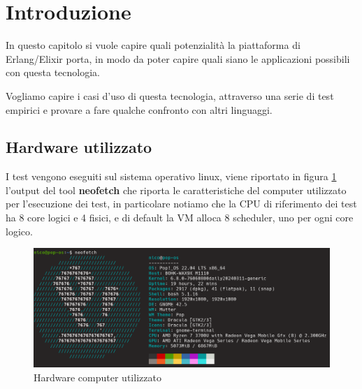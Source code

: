 \section{Introduzione}
In questo capitolo si vuole capire quali potenzialità
la piattaforma di Erlang/Elixir porta, in modo da poter
capire quali siano le applicazioni possibili con questa tecnologia.

Vogliamo capire i casi d'uso di questa tecnologia, attraverso una serie
di test empirici e provare a fare qualche confronto con altri
linguaggi.

\subsection{Hardware utilizzato}

I test vengono eseguiti sul sistema operativo linux, viene riportato in
figura \ref{fig:neofetch} l'output del tool \textbf{neofetch} che riporta
le caratteristiche del computer utilizzato per l'esecuzione dei test,
in particolare notiamo che la CPU di riferimento dei test
ha 8 core logici e 4 fisici, e di default la VM alloca 8 scheduler,
uno per ogni core logico.

\begin{figure}[!htp]
    \centering
    \includegraphics[keepaspectratio=true,scale=0.33]{images/neofetch.png}
	\caption{Hardware computer utilizzato}
  	\label{fig:neofetch}
\end{figure}



